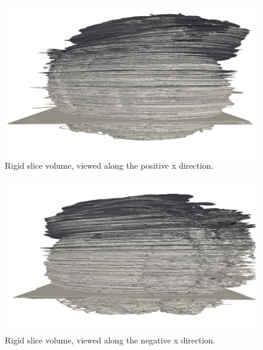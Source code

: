 	\begin{figure}
	  \centering
	  \includegraphics[width=0.9\textheight]{Ch7/Figs/Rat28/contours/whole_positive_x_rigid}
	  \caption{Rigid slice volume, viewed along the positive x direction.}
	  \label{fig:positive_x_rigid_contour}
	\end{figure}

	\begin{figure}
	  \centering
	  \includegraphics[width=0.9\textheight]{Ch7/Figs/Rat28/contours/whole_negative_x_rigid}
	  \caption{Rigid slice volume, viewed along the negative x direction.}
	  \label{fig:negative_x_rigid_contour}
	\end{figure}


